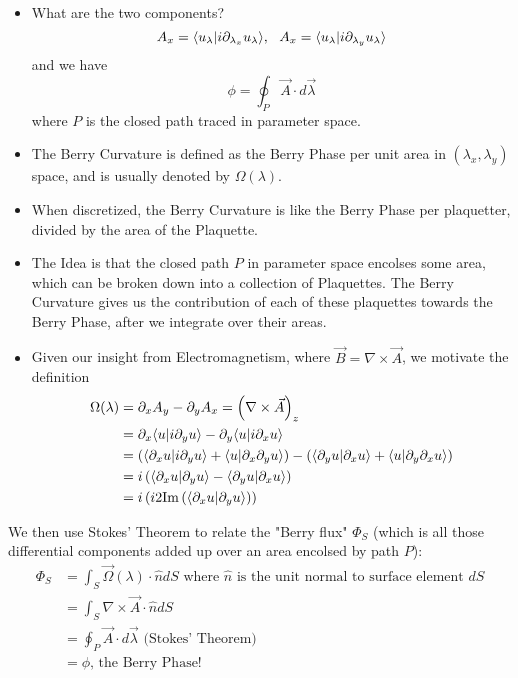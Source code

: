 \documentclass[11pt]{article}
\begin{document}
\begin{itemize}
  \item What are the two components? 
  $$ A_x = \langle u_{\lambda} | i{\partial_{\lambda_x}} u_{\lambda} \rangle,~~  A_x = \langle u_{\lambda} | i{\partial_{\lambda_y}} u_{\lambda} \rangle$$ and we have $$ \phi = \oint_{P} \vec{A} \cdot d\vec{\lambda} $$ where $P$ is the closed path traced in parameter space.

  \item The Berry Curvature is defined as the Berry Phase per unit area in $(\lambda_x, \lambda_y)$ space, and is usually denoted by $\Omega(\lambda)$.
  
  \item When discretized, the  Berry Curvature is like the Berry Phase per plaquetter, divided by the area of the Plaquette.
  
  \item The Idea is that the closed path $P$ in parameter space encolses some area, which can be broken down into a collection of Plaquettes. The Berry Curvature gives us the contribution of each of these plaquettes towards the Berry Phase, after we integrate over their areas.
  
  \item Given our insight from Electromagnetism, where $\vec{B} = \nabla \times \vec{A}$, we motivate the definition
  \begin{align*}
    \Omega(\lambda) &= \partial_x A_y - \partial_y A_x = \left( \nabla \times \vec{A} \right)_z \\
    &= \partial_x \langle u | i\partial_y u \rangle - \partial_y \langle u | i\partial_x u \rangle \\
    &= \left( \langle \partial_x u | i\partial_y u \rangle + \langle u | \partial_x \partial_y u \rangle \right) - \left( \langle \partial_y u | \partial_x u \rangle + \langle u | \partial_y \partial_x u \rangle \right) \\
    &= i \left( \langle \partial_x u |  \partial_y u \rangle - \langle \partial_y u | \partial_x u \rangle \right) \\
    &= i \left( i 2 \mathrm{Im} \left( \langle \partial_x u | \partial_y u \rangle \right) \right)
  \end{align*}
\end{itemize} We then use Stokes' Theorem to relate the "Berry flux" $\Phi_S$ (which is all those differential components added up over an area encolsed by path $P$):
\begin{align*}
  \Phi_S &= \int_{S} \vec{\Omega}(\lambda) \cdot \hat{n} dS \text{ where $\hat{n}$ is the unit normal to surface element $dS$} \\
  &= \int_{S} \nabla \times \vec{A} \cdot \hat{n} dS\\
  &= \oint_{P} \vec{A} \cdot d\vec{\lambda} \text{ (Stokes' Theorem) } \\
  &= \phi \text{, the Berry Phase!}
\end{align*}
\end{document}
